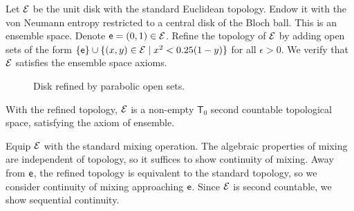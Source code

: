 \begin{example}\label{pm-es-diskRefinedByParabolas}
	Let $\Ens$ be the unit disk with the standard Euclidean topology. Endow it with the von Neumann entropy restricted to a central disk of the Bloch ball. This is an ensemble space. Denote $\ens[e] = (0,1) \in \Ens$. Refine the topology of $\Ens$ by adding open sets of the form $\{\ens[e]\} \cup \{(x,y) \in \Ens \mid x^2 < \epsilon(1-y)\}$ for all $\epsilon > 0$. We verify that $\Ens$ satisfies the ensemble space axioms.
	
	\begin{figure}[H]
		\centering
		\caption{Disk refined by parabolic open sets.}
	\end{figure}
	
	With the refined topology, $\Ens$ is a non-empty $\mathsf{T}_0$ second countable topological space, satisfying the axiom of ensemble. 
	
	Equip $\Ens$ with the standard mixing operation. The algebraic properties of mixing are independent of topology, so it suffices to show continuity of mixing. Away from $\ens[e]$, the refined topology is equivalent to the standard topology, so we consider continuity of mixing approaching $\ens[e]$. Since $\Ens$ is second countable, we show sequential continuity.
	

\end{example}
